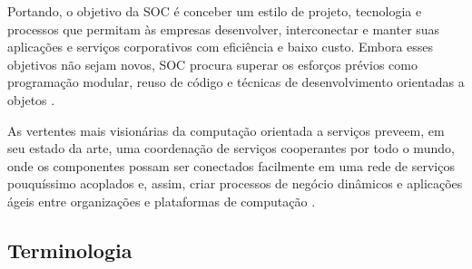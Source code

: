 Portando, o objetivo da SOC é conceber um estilo de projeto, tecnologia e
processos que permitam às empresas desenvolver, interconectar e manter suas
aplicações e serviços corporativos com eficiência e baixo custo. Embora esses
objetivos não sejam novos, SOC procura superar os esforços prévios como
programação modular, reuso de código e técnicas de desenvolvimento orientadas a
objetos \cite{papazoglou2007serviceApprTechRechIss}.

As vertentes mais visionárias da computação orientada a serviços preveem, em seu
estado da arte, uma coordenação de serviços cooperantes por todo o mundo, onde
os componentes possam ser conectados facilmente em uma rede de serviços pouquíssimo acoplados e, assim, criar
processos de negócio dinâmicos e aplicações ágeis entre organizações e plataformas de
computação \cite{leymann2005combining}.


\subsection{Terminologia}
\vspace{-6mm}

